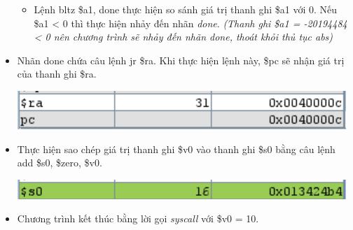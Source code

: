 \documentclass[12pt,a4paper,oneside]{article}
\begin{document}
\begin{itemize}
\begin{itemize}
\begin{center}
		\end{center}
		\item Lệnh \colorbox{code}{bltz \$a1, done} thực hiện so sánh giá trị thanh ghi \$a1 với 0. Nếu \$a1 < 0 thì thực hiện nhảy đến nhãn \textit{done}. \textit{(Thanh ghi \$a1 = -20194484 < 0 nên chương trình sẽ nhảy đến nhãn done, thoát khỏi thủ tục abs)} 
		\end{itemize}	 
	\item Nhãn done chứa câu lệnh \colorbox{code}{jr \$ra}. Khi thực hiện lệnh này, \$pc sẽ nhận giá trị của thanh ghi \$ra.
	\begin{center}
	\includegraphics[scale=1]{image/1.6}
	\end{center}
	\item Thực hiện sao chép giá trị thanh ghi \$v0 vào thanh ghi \$s0 bằng câu lệnh \colorbox{code}{add \$s0, \$zero, \$v0}.
	\begin{center}
	\includegraphics[scale=1]{image/1.7}
	\end{center}
	\item Chương trình kết thúc bằng lời gọi \textit{syscall} với \$v0 = 10.
	\end{itemize}
	\pagebreak
\end{document}
